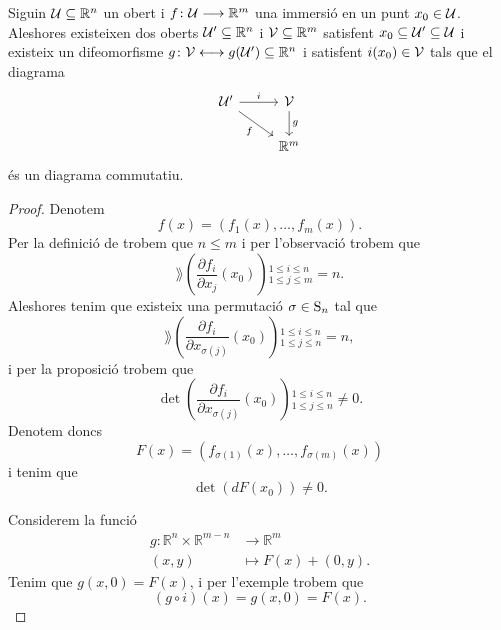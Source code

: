 \documentclass[../../Main.tex]{subfiles}
\begin{document}
	\begin{theorem}
		\label{thm:Teorema d'estructura local de les immersions}
		Siguin \(\mathcal{U}\subseteq\mathbb{R}^{n}\) un obert i \(f\colon\mathcal{U}\longrightarrow\mathbb{R}^{m}\) una immersió en un punt \(x_{0}\in\mathcal{U}\). Aleshores existeixen dos oberts \(\mathcal{U}'\subseteq\mathbb{R}^{n}\) i \(\mathcal{V}\subseteq\mathbb{R}^{m}\) satisfent \(x_{0}\subseteq\mathcal{U}'\subseteq\mathcal{U}\) i existeix un difeomorfisme \(g\colon\mathcal{V}\longleftrightarrow g(\mathcal{U}')\subseteq\mathbb{R}^{n}\) i satisfent \(i(x_{0})\in\mathcal{V}\) tals que el diagrama
		\[\begin{tikzcd}
			\obert{U}' \arrow{r}{i} \arrow[swap]{dr}{f} & \obert{V} \arrow{d}{g} \\
			& \mathbb{R}^{m}
		\end{tikzcd}\]
		és un diagrama commutatiu.
		\begin{proof}
			Denotem
			\[f(x)=(f_{1}(x),\dots,f_{m}(x)).\]
			Per la definició de  trobem que \(n\leq m\) i per l'observació  trobem que
			\[\rang\left(\frac{\partial f_{i}}{\partial x_{j}}(x_{0})\right){}_{1\leq j\leq m}^{1\leq i\leq n}=n.\]
			Aleshores tenim que existeix una permutació \(\sigma\in\operatorname{S}_{n}\) tal que
			\[\rang\left(\frac{\partial f_{i}}{\partial x_{\sigma(j)}}(x_{0})\right){}_{1\leq j\leq n}^{1\leq i\leq n}=n,\]
			i per la proposició  trobem que
			\[\det\left(\frac{\partial f_{i}}{\partial x_{\sigma(j)}}(x_{0})\right){}_{1\leq j\leq n}^{1\leq i\leq n}\neq0.\]
			Denotem doncs
			\[F(x)=(f_{\sigma(1)}(x),\dots,f_{\sigma(m)}(x))\]
			i tenim que
			\begin{equation}
				\label{thm:Teorema d'estructura local de les immersions:eq:1}
				\det(dF(x_{0}))\neq0.
			\end{equation}
			
			Considerem la funció
			\begin{align*}
				g\colon\mathbb{R}^{n}\times\mathbb{R}^{m-n}&\longrightarrow\mathbb{R}^{m} \\
				(x,y)&\longmapsto F(x)+(0,y).
			\end{align*}
			Tenim que \(g(x,0)=F(x)\), i per l'exemple  trobem que
			\[(g\circ i)(x)=g(x,0)=F(x).\]
			

\end{proof}
\end{theorem}
\end{document}
